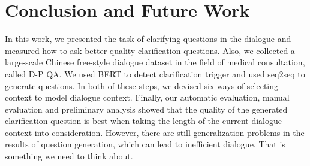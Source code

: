 \section{Conclusion and Future Work}
\label{conclude}

In this work, we presented the task of clarifying questions in the dialogue and measured how to ask better quality clarification questions. Also, we collected a large-scale Chinese free-style dialogue dataset in the field of medical consultation, called D-P QA. We used BERT to detect clarification trigger and used seq2seq to generate questions. In both of these steps, we devised six ways of selecting context to model dialogue context. Finally, our automatic evaluation, manual evaluation and preliminary analysis showed that the quality of the generated clarification question is best when taking the length of the current dialogue context into consideration. However, there are still generalization problems in the results of question generation, which can lead to inefficient dialogue. That is something we need to think about.
